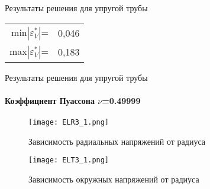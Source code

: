 \documentclass{beamer}
\begin{document}
\begin{frame}{Результаты решения для упругой трубы}
\begin{multicols}{2}
{%
}
\vspace*{-3mm}
\small{
\begin{table}
\begin{tabular}{r@{}l}
min$\left|\varepsilon^{*}_{V}\right|$= & 0,046 \\
max$\left|\varepsilon^{*}_{V}\right|$= & 0,183 \\
\end{tabular}
\end{table}
}

\end{multicols}

\end{frame}

\begin{frame}{Результаты решения для упругой трубы}
\framesubtitle{Коэффициент Пуассона $\nu$=0.49999}

\begin{multicols}{2}
\begin{figure}[h]
\centering
\texttt{[image: ELR3\_1.png]}
\caption{Зависимость радиальных напряжений от радиуса}
\end{figure}
\vspace{-2em}
\begin{figure}
\centering
\texttt{[image: ELT3\_1.png]}
\caption{Зависимость окружных напряжений от радиуса}
\end{figure}

\columnbreak


\end{multicols}
\end{frame}
\end{document}
